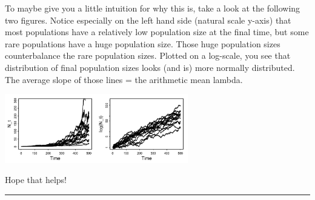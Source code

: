 \documentclass{article}
\begin{document}
To maybe give you a little intuition for why this is, take a look at the following two figures. Notice especially on the left hand side (natural scale y-axis) that most populations have a relatively low population size at the final time, but some rare populations have a huge population size. Those huge population sizes counterbalance the rare population sizes. Plotted on a log-scale, you see that distribution of final population sizes looks (and is) more normally distributed.
The average slope of those lines = the arithmetic mean lambda.

\begin{center}
 \includegraphics[width=8cm]{figs/image1}
\end{center}

Hope that helps!

\rule[0.5ex]{\linewidth}{1pt}
\end{document}
